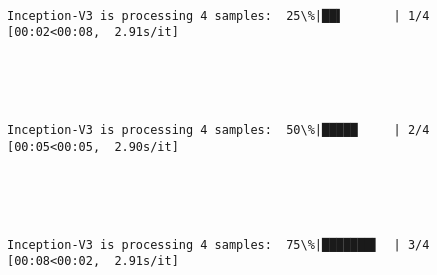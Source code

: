 \documentclass[11pt]{article}
\begin{document}
    \begin{center}
    \end{center}
    { \hspace*{\fill} \\}
    
    \begin{Verbatim}[commandchars=\\\{\}]
Inception-V3 is processing 4 samples:  25\%|██▌       | 1/4 [00:02<00:08,  2.91s/it]
    \end{Verbatim}

    \begin{center}
    \end{center}
    { \hspace*{\fill} \\}
    
    \begin{center}
    \end{center}
    { \hspace*{\fill} \\}
    
    \begin{Verbatim}[commandchars=\\\{\}]
Inception-V3 is processing 4 samples:  50\%|█████     | 2/4 [00:05<00:05,  2.90s/it]
    \end{Verbatim}

    \begin{center}
    \end{center}
    { \hspace*{\fill} \\}
    
    \begin{center}
    \end{center}
    { \hspace*{\fill} \\}
    
    \begin{Verbatim}[commandchars=\\\{\}]
Inception-V3 is processing 4 samples:  75\%|███████▌  | 3/4 [00:08<00:02,  2.91s/it]
    \end{Verbatim}
\end{document}
